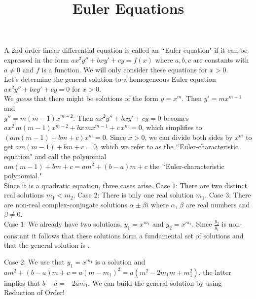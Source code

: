 \documentclass{ximera}
\begin{document}
\begin{abstract}
 \end{abstract}

    \title{Euler Equations}
    
    \maketitle

 A 2nd order linear differential equation is called an $``$Euler equation" if it can be expressed in the form $ax^2 y''+bxy'+cy=f(x)$ where $a,b,c$ are constants with $a\neq 0$ and $f$ is a function.  We will only consider these equations for $x>0$.\\

 Let's determine the general solution to a homogeneous Euler equation $ax^2 y''+bxy'+cy=0$ for $x>0$.\\

 We \emph{guess} that there might be solutions of the form $y=x^m$.  Then $y'=mx^{m-1}$ and \\$y''=m(m-1)x^{m-2}$.  Then $ax^2 y''+bxy'+cy=0$ becomes\\ $ax^2\,m(m-1)x^{m-2}+bx\,mx^{m-1}+c\,x^m=0$, which simplifies to $(am(m-1)+bm+c)x^m=0$.  Since $x>0$, we can divide both sides by $x^m$ to get $am(m-1)+bm+c=0$, which we refer to as the $``$Euler-characteristic equation" and call the polynomial \\$am(m-1)+bm+c=am^2+(b-a)m+c$ the $``$Euler-characteristic polynomial."\\

Since it is a quadratic equation, three cases arise.  Case $1$: There are two distinct real solutions $m_1<m_2$.  Case $2$: There is only one real solution $m_1$.  Case $3$:  There are non-real complex-conjugate solutions $\alpha \pm \beta i$ where $\alpha$, $\beta$ are real numbers and $\beta\neq 0$.\\

Case $1$: We already have two solutions, $y_1=x^{m_1}$ and $y_2=x^{m_2}$.  Since $\displaystyle \frac{y_2}{y_1}$ is non-constant it follows that these solutions form a fundamental set of solutions and that the general solution is .

\newpage

Case $2$: We use that $y_1=x^{m_1}$ is a solution and\\ $am^2+(b-a)m+c=a(m-m_1)^2=a(m^2-2m_1 m+m_1^2)$, the latter implies that $b-a=-2am_1$.  We can build the general solution by using Reduction of Order!\\
\end{document}

